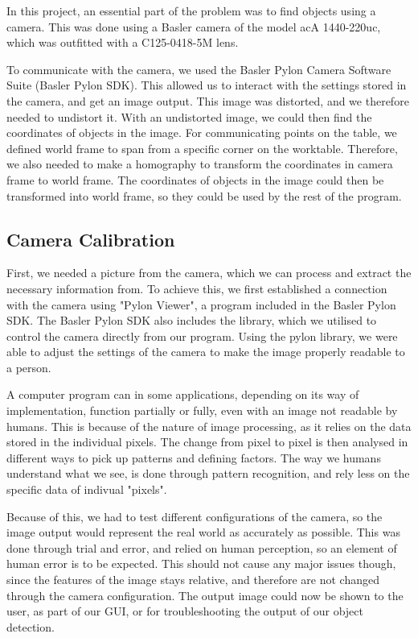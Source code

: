 \label{sec:camera}

In this project, an essential part of the problem was to find objects using a camera.
This was done using a Basler camera of the model acA 1440-220uc, which was outfitted with a C125-0418-5M lens.

To communicate with the camera, we used the Basler Pylon Camera Software Suite (Basler Pylon SDK).
This allowed us to interact with the settings stored in the camera, and get an image output.
This image was distorted, and we therefore needed to undistort it.
With an undistorted image, we could then find the coordinates of objects in the image.
For communicating points on the table, we defined world frame to span from a specific corner on the worktable.
Therefore, we also needed to make a homography to transform the coordinates in camera frame to world frame.
The coordinates of objects in the image could then be transformed into world frame, so they could be used by the rest of the program.

\subsection{Camera Calibration}
First, we needed a picture from the camera, which we can process and extract the necessary information from.
To achieve this, we first established a connection with the camera using "Pylon Viewer", a program included in the Basler Pylon SDK.
The Basler Pylon SDK also includes the library, which we utilised to control the camera directly from our program.
Using the pylon library, we were able to adjust the settings of the camera to make the image properly readable to a person. 

A computer program can in some applications, depending on its way of implementation, function partially or fully, even with an image not readable by humans.
This is because of the nature of image processing, as it relies on the data stored in the individual pixels.
The change from pixel to pixel is then analysed in different ways to pick up patterns and defining factors. 
The way we humans understand what we see, is done through pattern recognition, and rely less on the specific data of indivual "pixels".

Because of this, we had to test different configurations of the camera, so the image output would represent the real world as accurately as possible.
This was done through trial and error, and relied on human perception, so an element of human error is to be expected. 
This should not cause any major issues though, since the features of the image stays relative, and therefore are not changed through the camera configuration.
The output image could now be shown to the user, as part of our GUI, or for troubleshooting the output of our object detection. 

